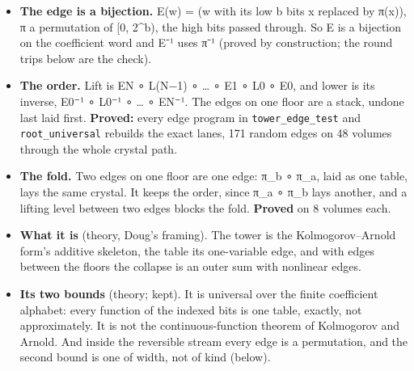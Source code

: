 \begin{itemize}
\item \textbf{The edge is a bijection.} E(w) = (w with its low b bits x replaced by π(x)), π a permutation of [0, 2\textasciicircum{}b), the high bits passed through. So E is a bijection on the coefficient word and E⁻¹ uses π⁻¹ (proved by construction; the round trips below are the check).
\item \textbf{The order.} Lift is EN ∘ L(N−1) ∘ … ∘ E1 ∘ L0 ∘ E0, and lower is its inverse, E0⁻¹ ∘ L0⁻¹ ∘ … ∘ EN⁻¹. The edges on one floor are a stack, undone last laid first. \textbf{Proved:} every edge program in \texttt{tower\_\allowbreak{}edge\_\allowbreak{}test} and \texttt{root\_\allowbreak{}universal} rebuilds the exact lanes, 171 random edges on 48 volumes through the whole crystal path.
\item \textbf{The fold.} Two edges on one floor are one edge: π\_\allowbreak{}b ∘ π\_\allowbreak{}a, laid as one table, lays the same crystal. It keeps the order, since π\_\allowbreak{}a ∘ π\_\allowbreak{}b lays another, and a lifting level between two edges blocks the fold. \textbf{Proved} on 8 volumes each.
\item \textbf{What it is} (theory, Doug's framing). The tower is the Kolmogorov–Arnold form's additive skeleton, the table its one-variable edge, and with edges between the floors the collapse is an outer sum with nonlinear edges.
\item \textbf{Its two bounds} (theory; kept). It is universal over the finite coefficient alphabet: every function of the indexed bits is one table, exactly, not approximately. It is not the continuous-function theorem of Kolmogorov and Arnold. And inside the reversible stream every edge is a permutation, and the second bound is one of width, not of kind (below).

\end{itemize}
